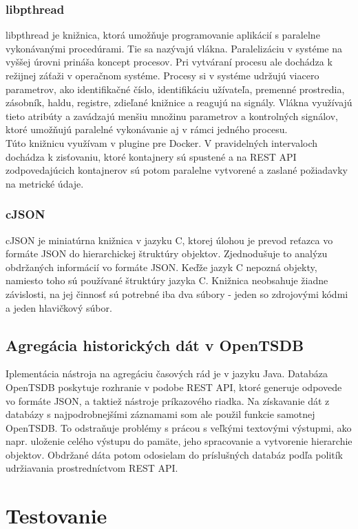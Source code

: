 \documentclass[printed,11pt,twoside,color,cover,table]{fithesis3}
\begin{document}
\subsection{libpthread}
libpthread je knižnica, ktorá umožňuje programovanie aplikácií s paralelne vykonávanými procedúrami. Tie sa nazývajú vlákna. Paralelizáciu
v systéme na vyššej úrovni prináša koncept procesov. Pri
vytváraní procesu ale dochádza k režijnej záťaži v operačnom systéme. Procesy si v systéme udržujú viacero parametrov, ako identifikačné
číslo, identifikáciu užívateľa, premenné prostredia, zásobník, haldu, registre, zdieľané knižnice a reagujú na signály. Vlákna využívajú
tieto atribúty a zavádzajú menšiu množinu parametrov a kontrolných signálov, ktoré umožňujú paralelné vykonávanie aj v rámci jedného procesu.
\\Túto knižnicu využívam v plugine pre Docker. V pravidelných intervaloch dochádza k zisťovaniu, ktoré kontajnery sú spustené a na REST API
zodpovedajúcich kontajnerov sú potom paralelne vytvorené a zaslané požiadavky na metrické údaje.

\subsection{cJSON}
cJSON je miniatúrna knižnica v jazyku C, ktorej úlohou je prevod reťazca vo formáte JSON do hierarchickej štruktúry objektov. Zjednodušuje
to analýzu obdržaných informácií vo formáte JSON. Keďže jazyk C nepozná objekty, namiesto toho sú používané štruktúry jazyka C. 
Knižnica neobsahuje žiadne závislosti, na jej činnosť sú potrebné iba dva súbory - jeden so zdrojovými kódmi a jeden hlavičkový súbor.

\section{Agregácia historických dát v OpenTSDB}
Iplementácia nástroja na agregáciu časových rád je v jazyku Java. Databáza OpenTSDB poskytuje rozhranie v podobe REST API, ktoré
generuje odpovede vo formáte JSON, a taktiež
nástroje príkazového riadka. Na získavanie dát z databázy s najpodrobnejšími záznamami som ale použil
funkcie samotnej OpenTSDB. To odstraňuje problémy s prácou s veľkými textovými výstupmi, ako napr. uloženie celého výstupu do pamäte,
jeho spracovanie a vytvorenie hierarchie objektov. Obdržané dáta potom odosielam do príslušných databáz podľa politík udržiavania
prostredníctvom REST API. 

\chapter{Testovanie}
\end{document}
